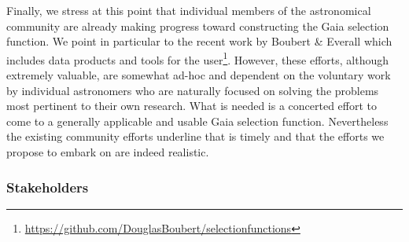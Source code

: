 Finally, we stress at this point that individual members of the astronomical community are already making progress toward constructing the Gaia selection function. We point in particular to the recent work by Boubert \& Everall \cite{Boubert2020a, Boubert2020b} which includes data products and tools for the user\footnote{\url{https://github.com/DouglasBoubert/selectionfunctions}}. However, these efforts, although extremely valuable, are somewhat ad-hoc and dependent on the voluntary work by individual astronomers who are naturally focused on solving the problems most pertinent to their own research. What is needed is a concerted effort to come to a generally applicable and usable Gaia selection function. Nevertheless the existing community efforts underline that {\acro} is timely and that the efforts we propose to embark on are indeed realistic.

\subsubsection{Stakeholders}
\label{sec:stakeholders}

